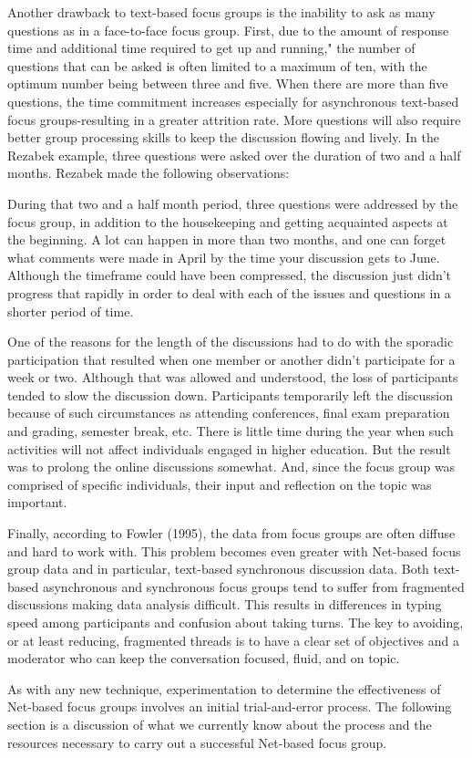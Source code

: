 \documentclass{beamer}
\begin{document}
\begin{frame}
Another drawback to text-based focus groups is the inability to ask as many questions as in a face-to-face focus group. First, due to the amount of response time and additional time required to get up and running," the number of questions that can be asked is often limited to a maximum of ten, with the optimum number being between three and five. When there are more than five questions, the time commitment increases especially for asynchronous text-based focus groups-resulting in a greater attrition rate. More questions will also require better group processing skills to keep the discussion flowing and lively. In the Rezabek example, three questions were asked over the duration of two and a half months. Rezabek made the following observations:


	During that two and a half month period, three questions were addressed by the focus group, in addition to the housekeeping and getting acquainted aspects at the beginning. A lot can happen in more than two months, and one can forget what comments were made in April by the time your discussion gets to June. Although the timeframe could have been compressed, the discussion just didn't progress that rapidly in order to deal with each of the issues and questions in a shorter period of time.
	
	One of the reasons for the length of the discussions had to do with the sporadic participation that resulted when one member or another didn't participate for a week or two. Although that was allowed and understood, the loss of participants tended to slow the discussion down. Participants temporarily left the discussion because of such circumstances as attending conferences, final exam preparation and grading, semester break, etc. There is little time during the year when such activities will not affect individuals engaged in higher education. But the result was to prolong the online discussions somewhat. And, since the focus group was comprised of specific individuals, their input and reflection on the topic was important.


Finally, according to Fowler (1995), the data from focus groups are often diffuse and hard to work with. This problem becomes even greater with Net-based focus group data and in particular, text-based synchronous discussion data. Both text-based asynchronous and synchronous focus groups tend to suffer from fragmented discussions making data analysis difficult. This results in differences in typing speed among participants and confusion about taking turns. The key to avoiding, or at least reducing, fragmented threads is to have a clear set of objectives and a moderator who can keep the conversation focused, fluid, and on topic.

As with any new technique, experimentation to determine the effectiveness of Net-based focus groups involves an initial trial-and-error process. The following section is a discussion of what we currently know about the process and the resources necessary to carry out a successful Net-based focus group.


  \end{frame}
  
\end{document}
